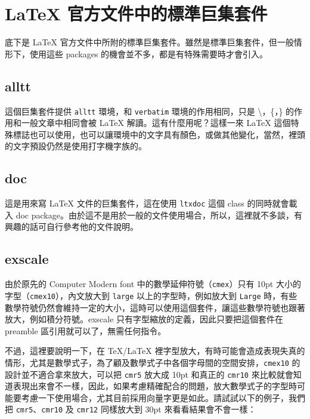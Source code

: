 \section{\LaTeX{} 官方文件中的標準巨集套件}

底下是 \LaTeX{} 官方文件中所附的標準巨集套件。雖然是標準巨集套件，但一般情形下，使用這些 packages 的機會並不多，都是有特殊需要時才會引入。

\subsection{alltt}

這個巨集套件提供 \texttt{alltt} 環境，和 \texttt{verbatim} 環境的作用相同，只是 \textbackslash{}，\{，\} 的作用和一般文章中相同會被 \LaTeX{} 解讀。這有什麼用呢？這樣一來 \LaTeX{} 這個特殊標誌也可以使用，也可以讓環境中的文字具有顏色，或做其他變化，當然，裡頭的文字預設仍然是使用打字機字族的。

\subsection{doc}

這是用來寫 \LaTeX{} 文件的巨集套件，這在使用 \texttt{ltxdoc} 這個 class 的同時就會載入 \textsf{doc} package。由於這不是用於一般的文件使用場合，所以，這裡就不多談，有興趣的話可自行參考他的文件說明。

\subsection{exscale}

由於原先的 Computer Modern font 中的數學延伸符號（\texttt{cmex}）只有 10pt 大小的字型（\texttt{cmex10}），內文放大到 \texttt{large} 以上的字型時，例如放大到 \texttt{Large} 時，有些數學符號仍然會維持一定的大小，這時可以使用這個套件，讓這些數學符號也跟著放大，例如積分符號。\textsf{exscale} 只有字型縮放的定義，因此只要把這個套件在 preamble 區引用就可以了，無需任何指令。

不過，這裡要說明一下，在 \TeX/\LaTeX{} 裡字型放大，有時可能會造成表現失真的情形，尤其是數學式子，為了顧及數學式子中各個字母間的空間安排，\texttt{cmex10} 的設計並不適合拿來放大，可以把 \texttt{cmr5} 放大成 10pt 和真正的 \texttt{cmr10} 來比較就會知道表現出來會不一樣，因此，如果考慮精確配合的問題，放大數學式子的字型時可能要考慮一下使用場合，尤其目前採用向量字更是如此。請試試以下的例子，我們把 \texttt{cmr5}、\texttt{cmr10} 及 \texttt{cmr12} 同樣放大到 30pt 來看看結果會不會一樣：

